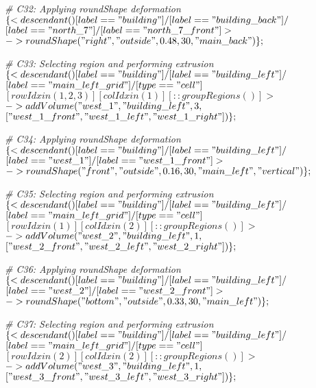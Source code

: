 \noindent \textit{\# C32: Applying roundShape deformation}\\
$\{< descendant() [label=="building"] / [label=="building\_back"] / $\\
$[label=="north\_7"] / [label=="north\_7\_front"] > $\\
$-> roundShape("right", "outside", 0.48, 30, "main\_back")\};$

\noindent \textit{\# C33: Selecting region and performing extrusion}\\
$\{< descendant() [label=="building"] / [label=="building\_left"] / $\\
$[label=="main\_left\_grid"] / [type=="cell"] $\\
$[rowIdx in (1, 2, 3)] [colIdx in (1)] [::groupRegions()] > $\\
$-> addVolume("west\_1", "building\_left", 3, $\\
$["west\_1\_front", "west\_1\_left", "west\_1\_right"])\};$

\noindent \textit{\# C34: Applying roundShape deformation}\\
$\{< descendant() [label=="building"] / [label=="building\_left"] / $\\
$[label=="west\_1"] / [label=="west\_1\_front"] > $\\
$-> roundShape("front", "outside", 0.16, 30, "main\_left", "vertical")\};$

\noindent \textit{\# C35: Selecting region and performing extrusion}\\
$\{< descendant() [label=="building"] / [label=="building\_left"] / $\\
$[label=="main\_left\_grid"] / [type=="cell"] $\\
$[rowIdx in (1)] [colIdx in (2)] [::groupRegions()] > $\\
$-> addVolume("west\_2", "building\_left", 1, $\\
$["west\_2\_front", "west\_2\_left", "west\_2\_right"])\};$

\noindent \textit{\# C36: Applying roundShape deformation}\\
$\{< descendant() [label=="building"] / [label=="building\_left"] / $\\
$[label=="west\_2"] / [label=="west\_2\_front"] > $\\
$-> roundShape("bottom", "outside", 0.33, 30, "main\_left")\};$

\noindent \textit{\# C37: Selecting region and performing extrusion}\\
$\{< descendant() [label=="building"] / [label=="building\_left"] / $\\
$[label=="main\_left\_grid"] / [type=="cell"] $\\
$[rowIdx in (2)] [colIdx in (2)] [::groupRegions()] > $\\
$-> addVolume("west\_3", "building\_left", 1, $\\
$["west\_3\_front", "west\_3\_left", "west\_3\_right"])\};$

